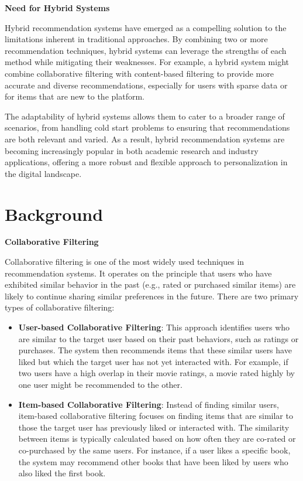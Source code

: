 \documentclass{article}
\begin{document}
\textbf{Need for Hybrid Systems}

Hybrid recommendation systems have emerged as a compelling solution to the limitations inherent in traditional approaches. By combining two or more recommendation techniques, hybrid systems can leverage the strengths of each method while mitigating their weaknesses. For example, a hybrid system might combine collaborative filtering with content-based filtering to provide more accurate and diverse recommendations, especially for users with sparse data or for items that are new to the platform.

The adaptability of hybrid systems allows them to cater to a broader range of scenarios, from handling cold start problems to ensuring that recommendations are both relevant and varied. As a result, hybrid recommendation systems are becoming increasingly popular in both academic research and industry applications, offering a more robust and flexible approach to personalization in the digital landscape.

\section{Background}

\textbf{Collaborative Filtering}

Collaborative filtering is one of the most widely used techniques in recommendation systems. It operates on the principle that users who have exhibited similar behavior in the past (e.g., rated or purchased similar items) are likely to continue sharing similar preferences in the future. There are two primary types of collaborative filtering:

\begin{itemize}
    \item \textbf{User-based Collaborative Filtering}: This approach identifies users who are similar to the target user based on their past behaviors, such as ratings or purchases. The system then recommends items that these similar users have liked but which the target user has not yet interacted with. For example, if two users have a high overlap in their movie ratings, a movie rated highly by one user might be recommended to the other.
    \item \textbf{Item-based Collaborative Filtering}: Instead of finding similar users, item-based collaborative filtering focuses on finding items that are similar to those the target user has previously liked or interacted with. The similarity between items is typically calculated based on how often they are co-rated or co-purchased by the same users. For instance, if a user likes a specific book, the system may recommend other books that have been liked by users who also liked the first book.
\end{itemize}
\end{document}
